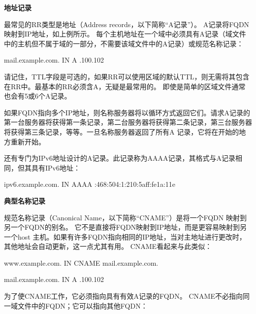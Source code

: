 ﻿\documentclass[english,runningheads,a4paper]{llncs}[2018/03/10]
\begin{document}
\vbox{}

\par\noindent\textbf{地址记录}

\par\noindent 最常见的RR类型是地址（Address records，以下简称“A记录”）。 A记录将FQDN映射到IP地址，如上例所示。 每个主机地址在一个域中必须具有A记录（域文件中的主机但不属于域的一部分，不需要该域文件中的A记录）或规范名称记录：

\par\setlength\parindent{2em}mail.example.com.  \qquad IN \qquad A .100.102

\par\setlength\parindent{2em}请记住，TTL字段是可选的，如果RR可以使用区域的默认TTL，则无需将其包含在RR中。最基本的RR必须含A，无疑是最常用的。 即使是简单的区域文件通常也会有5或6个A记录。

\par\setlength\parindent{2em}如果FQDN指向多个IP地址，则名称服务器将以循环方式返回它们。请求A记录的第一台服务器将获得第一条记录，第二台服务器将获得第二条记录，第三台服务器将获得第三条记录，等等。一旦名称服务器返回了所有A 记录，它将在开始的地方重新开始。

\par\setlength\parindent{2em}还有专门为IPv6地址设计的A记录。此记录称为AAAA记录，其格式与A记录相同，但其具有IPv6地址：

\par\setlength\parindent{2em}ipv6.example.com.  \quad IN \quad AAAA :468:504:1:210:5aff:fe1a:11e

\vbox{}

\par\noindent\textbf{典型名称记录}

\par\noindent 规范名称记录（Canonical Name，以下简称“CNAME”）是将一个FQDN 映射到另一个FQDN的别名。 它不是直接将FQDN映射到IP地址，而是更容易映射到另一个host 主机。如果有许多FQDN指向相同的IP地址，当对主地址进行更改时，其他地址会自动更新，这一点尤其有用。 CNAME看起来与此类似：

\par\setlength\parindent{2em}www.example.com.  \qquad IN \qquad CNAME \qquad mail.example.com.

\par\setlength\parindent{2em}mail.example.com.  \qquad IN \qquad A .100.102

\par\setlength\parindent{2em}为了使CNAME工作，它必须指向具有有效A记录的FQDN。 CNAME不必指向同一域文件中的FQDN；它可以指向其他FQDN：
\end{document}
